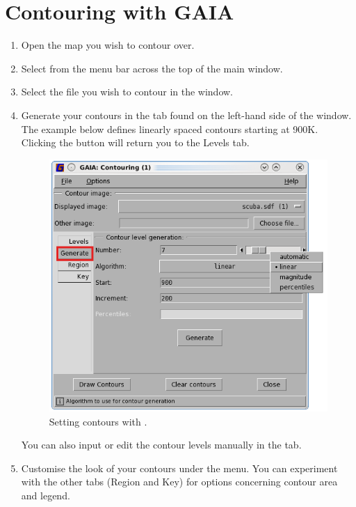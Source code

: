 \documentclass[11pt,oneside,chapters]{starlink}
\begin{document}
\section{Contouring with GAIA}
\begin{enumerate}[label=(\textbf{\arabic*})]
\item  Open the map you wish to contour over.

\item Select  from the menu bar
across the top of the main window.

\item Select the file you wish to contour in the  window.

\item Generate your contours in the  tab found on
the left-hand side of the  window. The example
below defines linearly spaced contours starting at 900K. Clicking the
 button will return you to the Levels tab.

\begin{figure}[h!]
\begin{center}
\includegraphics[width=0.4\linewidth]{sc20_contouring1}
\caption[Setting contours with \gaia.]{\label{fig:gaia_contour1}
  Setting contours with \gaia.}
\end{center}
\end{figure}

You can also input or edit the contour levels manually in the  tab.

\item Customise the look of your contours under the
 menu. You can experiment with the other tabs
(Region and Key) for options concerning contour area and legend.


\end{enumerate}
\end{document}
